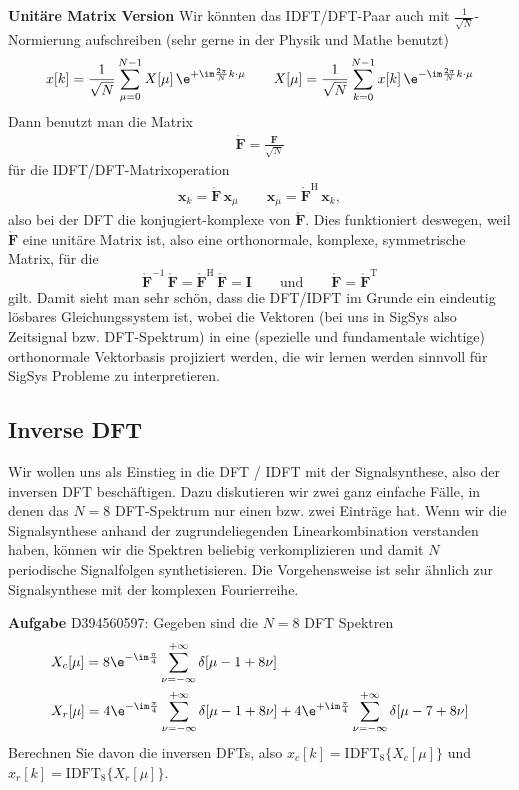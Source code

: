%
\noindent\textbf{Unitäre Matrix Version}
Wir könnten das IDFT/DFT-Paar auch mit $\frac{1}{\sqrt{N}}$-Normierung
aufschreiben (sehr gerne in der Physik und Mathe benutzt)
\begin{align}
x[k] = \frac{1}{\sqrt{N}} \sum_{\mu=0}^{N-1} X[\mu] \, \e^{+\im\frac{2\pi}{N} k \cdot \mu}
\qquad
X[\mu] = \frac{1}{\sqrt{N} }\sum_{k=0}^{N-1} x[k] \, \e^{-\im\frac{2\pi}{N} k \cdot \mu}
\end{align}
Dann benutzt man die Matrix
\begin{align}
\mathring{\mathbf{F}} = \frac{\mathbf{F}}{\sqrt{N}}
\end{align}
für die IDFT/DFT-Matrixoperation
\begin{align}
\bm{x}_k = \mathring{\mathbf{F}} \, \bm{x}_\mu
\qquad
\bm{x}_\mu = \mathring{\mathbf{F}}^\mathrm{H} \, \bm{x}_k,
\end{align}
also bei der DFT die konjugiert-komplexe von $\mathring{\mathbf{F}}$.
%
Dies funktioniert deswegen, weil $\mathring{\mathbf{F}}$ eine unitäre Matrix ist,
also eine orthonormale, komplexe, symmetrische Matrix, für die
\begin{equation}
\mathring{\mathbf{F}}^{-1} \, \mathring{\mathbf{F}}
=
\mathring{\mathbf{F}}^\mathrm{H} \, \mathring{\mathbf{F}}
=
\mathbf{I}
\qquad\text{und}\qquad
\mathring{\mathbf{F}} = \mathring{\mathbf{F}}^\mathrm{T}
\end{equation}
gilt.
%
Damit sieht man sehr schön, dass die DFT/IDFT im Grunde ein eindeutig lösbares
Gleichungssystem ist, wobei die Vektoren (bei uns in SigSys also Zeitsignal bzw.
DFT-Spektrum) in eine (spezielle und fundamentale wichtige)
orthonormale Vektorbasis projiziert werden, die wir lernen werden sinnvoll
für SigSys Probleme zu interpretieren.


\clearpage
\subsection{Inverse DFT}
\label{sec:D394560597}
\begin{Ziel}
Wir wollen uns als Einstieg in die DFT / IDFT mit der Signalsynthese, also
der inversen DFT beschäftigen. Dazu diskutieren wir zwei ganz einfache
Fälle, in denen das $N=8$ DFT-Spektrum nur einen bzw. zwei Einträge hat.
Wenn wir die Signalsynthese anhand der zugrundeliegenden Linearkombination
verstanden haben, können wir die Spektren beliebig verkomplizieren und damit
$N$ periodische Signalfolgen synthetisieren.
Die Vorgehensweise ist sehr ähnlich zur Signalsynthese mit der komplexen
Fourierreihe.
\end{Ziel}
\textbf{Aufgabe} {\tiny D394560597}: Gegeben sind die $N=8$ DFT Spektren
\begin{align}
&X_c[\mu] = 8\e^{-\im\frac{\pi}{4}} \sum_{\nu=-\infty}^{+\infty} \delta[\mu-1 + 8\nu]\\
&X_r[\mu] =
4\e^{-\im\frac{\pi}{4}} \sum_{\nu=-\infty}^{+\infty} \delta[\mu-1 + 8\nu] +
4\e^{+\im\frac{\pi}{4}} \sum_{\nu=-\infty}^{+\infty} \delta[\mu-7 + 8\nu]
\end{align}
Berechnen Sie davon die inversen DFTs, also $x_c[k] = \text{IDFT}_8\{X_c[\mu]\}$
und $x_r[k] = \text{IDFT}_8\{X_r[\mu]\}$.

